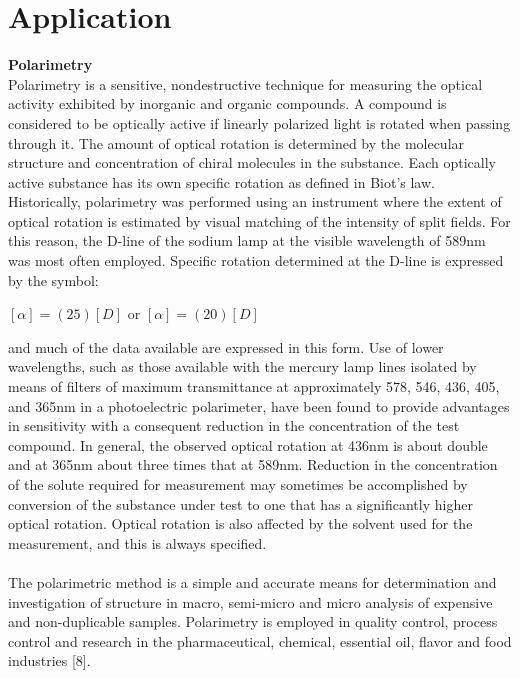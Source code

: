 \documentclass[a4paper,12pt]{report}
\begin{document}
\chapter{Application}
\textbf{Polarimetry}\\
Polarimetry is a sensitive, nondestructive technique for measuring the optical activity exhibited by inorganic and organic compounds. A compound is considered to be optically active if linearly polarized light is rotated when passing through it. The amount of optical rotation is determined by the molecular structure and concentration of chiral molecules in the substance. Each optically active substance has its own specific rotation as defined in Biot's law. Historically, polarimetry was performed using an instrument where the extent of optical rotation is estimated by visual matching of the intensity of split fields. For this reason, the D-line of the sodium lamp at the visible wavelength of 589nm was most often employed. Specific rotation determined at the D-line is expressed by the symbol:
\begin{center}
	$[\alpha]=(25) [D]$ or $[\alpha]=(20) [D]$
\end{center}
and much of the data available are expressed in this form. Use of lower wavelengths, such as those available with the mercury lamp lines isolated by means of filters of maximum transmittance at approximately 578, 546, 436, 405, and 365nm in a photoelectric polarimeter, have been found to provide advantages in sensitivity with a consequent reduction in the concentration of the test compound. In general, the observed optical rotation at 436nm is about double and at 365nm about three times that at 589nm. Reduction in the concentration of the solute required for measurement may sometimes be accomplished by conversion of the substance under test to one that has a significantly higher optical rotation. Optical rotation is also affected by the solvent used for the measurement, and this is always specified.\\\\
The polarimetric method is a simple and accurate means for determination and investigation of structure in macro, semi-micro and micro analysis of expensive and non-duplicable samples. Polarimetry is employed in quality control, process control and research in the pharmaceutical, chemical, essential oil, flavor and food industries [8].

 
\end{document}
